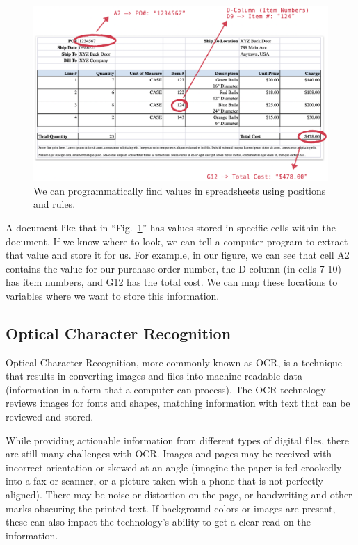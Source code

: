 \documentclass[conference]{IEEEtran}
\begin{document}
\begin{figure}[ht]
\centerline{\includegraphics[width=\columnwidth]{RulesBasedApproach.png}}
\caption{We can programmatically find values in spreadsheets using positions and rules.}
\label{figRulesBasedApproach}
\end{figure}

A document like that in ``Fig.~\ref{figRulesBasedApproach}'' has values stored in specific cells within the document. If we know where to look, we can tell a computer program to extract that value and store it for us. For example, in our figure, we can see that cell A2 contains the value for our purchase order number, the D column (in cells 7-10) has item numbers, and G12 has the total cost. We can map these locations to variables where we want to store this information.

\subsection{Optical Character Recognition}
Optical Character Recognition, more commonly known as OCR, is a technique that results in converting images and files into machine-readable data (information in a form that a computer can process). The OCR technology reviews images for fonts and shapes, matching information with text that can be reviewed and stored.

While providing actionable information from different types of digital files, there are still many challenges with OCR. Images and pages may be received with incorrect orientation or skewed at an angle (imagine the paper is fed crookedly into a fax or scanner, or a picture taken with a phone that is not perfectly aligned). There may be noise or distortion on the page, or handwriting and other marks obscuring the printed text. If background colors or images are present, these can also impact the technology's ability to get a clear read on the information.
\end{document}
